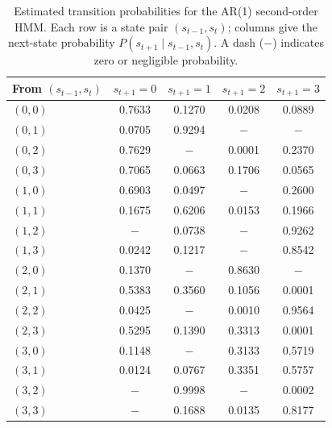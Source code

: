 \begin{table}[ht]
\centering
\begin{tabular}{lcccc}
\hline
From $(s_{t-1}, s_t)$ & $s_{t+1} = 0$ & $s_{t+1} = 1$ & $s_{t+1} = 2$ & $s_{t+1} = 3$ \\
\hline
$(0, 0)$ & 0.7633 & 0.1270 & 0.0208 & 0.0889 \\
$(0, 1)$ & 0.0705 & 0.9294 & $-$     & $-$     \\
$(0, 2)$ & 0.7629 & $-$     & 0.0001 & 0.2370 \\
$(0, 3)$ & 0.7065 & 0.0663 & 0.1706 & 0.0565 \\
\hline
$(1, 0)$ & 0.6903 & 0.0497 & $-$     & 0.2600 \\
$(1, 1)$ & 0.1675 & 0.6206 & 0.0153 & 0.1966 \\
$(1, 2)$ & $-$     & 0.0738 & $-$     & 0.9262 \\
$(1, 3)$ & 0.0242 & 0.1217 & $-$     & 0.8542 \\
\hline
$(2, 0)$ & 0.1370 & $-$     & 0.8630 & $-$     \\
$(2, 1)$ & 0.5383 & 0.3560 & 0.1056 & 0.0001 \\
$(2, 2)$ & 0.0425 & $-$     & 0.0010 & 0.9564 \\
$(2, 3)$ & 0.5295 & 0.1390 & 0.3313 & 0.0001 \\
\hline
$(3, 0)$ & 0.1148 & $-$     & 0.3133 & 0.5719 \\
$(3, 1)$ & 0.0124 & 0.0767 & 0.3351 & 0.5757 \\
$(3, 2)$ & $-$     & 0.9998 & $-$     & 0.0002 \\
$(3, 3)$ & $-$     & 0.1688 & 0.0135 & 0.8177 \\
\hline
\end{tabular}
\caption{Estimated transition probabilities for the AR(1) second-order HMM. Each row is a state pair $(s_{t-1}, s_t)$; columns give the next-state probability $P(s_{t+1} \mid s_{t-1}, s_t)$. A dash ($-$) indicates zero or negligible probability.}
\label{tab:second_order_hmm_transition}
\end{table}
